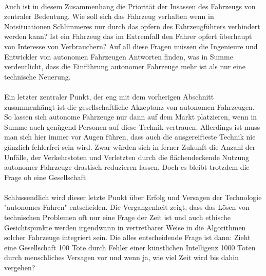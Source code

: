\documentclass[10pt,a4paper]{article}
\begin{document}
\\
Auch ist in diesem Zusammenhang die Priorität der Insassen des Fahrzeugs von zentraler Bedeutung. Wie soll sich das Fahrzeug verhalten wenn in Notsituationen Schlimmeres nur durch das opfern des Fahrzeugführers verhindert werden kann? Ist ein Fahrzeug das im Extremfall den Fahrer opfert überhaupt von Interesse von Verbrauchern? Auf all diese Fragen müssen die Ingenieure und Entwickler von autonomen Fahrzeugen Antworten finden, was in Summe verdeutlicht, dass die Einführung autonomer Fahrzeuge mehr ist als nur eine technische Neuerung.
\\
\\
Ein letzter zentraler Punkt, der eng mit dem vorherigen Abschnitt zusammenhängt ist die gesellschaftliche Akzeptanz von autonomen Fahrzeugen. So lassen sich autonome Fahrzeuge nur dann auf dem Markt platzieren, wenn in Summe auch genügend Personen auf diese Technik vertrauen. Allerdings ist muss man sich hier immer vor Augen führen, dass auch die ausgereifteste Technik nie gänzlich fehlerfrei sein wird. Zwar würden sich in ferner Zukunft die Anzahl der Unfälle, der Verkehrstoten und Verletzten durch die flächendeckende Nutzung autonomer Fahrzeuge drastisch reduzieren lassen. Doch es bleibt trotzdem die Frage ob eine Gesellschaft 
\\
\\
Schlussendlich wird dieser letzte Punkt über Erfolg und Versagen der Technologie "autonomes Fahren" entscheiden. Die Vergangenheit zeigt, dass das Lösen von technischen Problemen oft nur eine Frage der Zeit ist und auch ethische Gesichtspunkte werden irgendwann in vertretbarer Weise in die Algorithmen solcher Fahrzeuge integriert sein. Die alles entscheidende Frage ist dann: Zieht eine Gesellschaft 100 Tote durch Fehler einer künstlichen Intelligenz 1000 Toten durch menschliches Versagen vor und wenn ja, wie viel Zeit wird bis dahin vergehen? 
\end{document}
